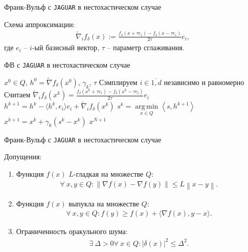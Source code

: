 \documentclass{beamer}
\DeclareMathOperator*{\argmin}{arg\,min}
\begin{document}
\begin{frame}{Франк-Вульф с \texttt{JAGUAR} в нестохастическом случае}

    Схема аппроксимации:
    \begin{align*}
        \widetilde{\nabla}_i f_\delta (x) :=  \frac{f_\delta (x + \tau e_i) - f_\delta(x - \tau e_i)}{2 \tau} e_i,
    \end{align*}
    где $e_i$ -- $i$-ый базисный вектор, $\tau$ -- параметр сглаживания.
    
    \begin{algorithm}[H]
        \caption{ФВ с \texttt{JAGUAR} в нестохастическом случае}
        \begin{algorithmic}
             $x^0 \in Q$, $h^0 = \widetilde\nabla f_{\delta}(x^0)$, $\gamma_k$, $\tau$
                \State Сэмплируем $i \in \overline{1, d}$ независимо и равномерно
                \State Считаем $\widetilde{\nabla}_i f_\delta (x^k) = \frac{f_\delta (x^k + \tau e_i) - f_\delta (x^k - \tau e_i)}{2 \tau} e_i$
                \State  $h^{k + 1} = h^k - \langle h^k, e_i \rangle e_i + \widetilde{\nabla}_i f_{\delta}(x^k)$
                \State $s^k = \argmin\limits_{x \in Q} \left<s, h^{k + 1} \right>$
                \State $x^{k + 1} = x^k + \gamma_k (s^k - x^k)$
            \EndFor
             $x^{N + 1}$
        \end{algorithmic}
    \end{algorithm}
        
\end{frame}


\begin{frame}{Франк-Вульф с \texttt{JAGUAR} в нестохастическом случае}

    Допущения:
    \begin{enumerate}
        \item Функция $f(x)$ $L$-гладкая на множестве $Q$: 
            \begin{align*}
                \forall\ x, y \in Q: \left\| \nabla f(x) - \nabla f(y) \right\| \leq L \left\| x - y\right\|.
            \end{align*}

        \item Функция $f(x)$ выпукла на множестве $Q$:
            \begin{align*}
                \forall\ x, y \in Q: f(y) \geq f(x) + \langle \nabla f(x), y - x \rangle.
            \end{align*}

        \item Ограниченность оракульного шума:
            \begin{align*}
                \exists\ \Delta > 0 \forall\ x \in Q: |\delta(x)|^2 \leq \Delta^2.
            \end{align*}
                
    \end{enumerate}

\end{frame}
\end{document}
